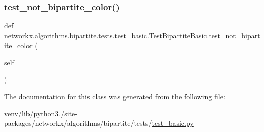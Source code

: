 \subsubsection{\texorpdfstring{test\+\_\+not\+\_\+bipartite\+\_\+color()}{test\_not\_bipartite\_color()}}
{\footnotesize\ttfamily def networkx.\+algorithms.\+bipartite.\+tests.\+test\+\_\+basic.\+Test\+Bipartite\+Basic.\+test\+\_\+not\+\_\+bipartite\+\_\+color (\begin{DoxyParamCaption}\item[{}]{self }\end{DoxyParamCaption})}



The documentation for this class was generated from the following file\+:\begin{DoxyCompactItemize}
\item 
venv/lib/python3./site-\/packages/networkx/algorithms/bipartite/tests/\hyperlink{networkx_2algorithms_2bipartite_2tests_2test__basic_8py}{test\+\_\+basic.\+py}\end{DoxyCompactItemize}
